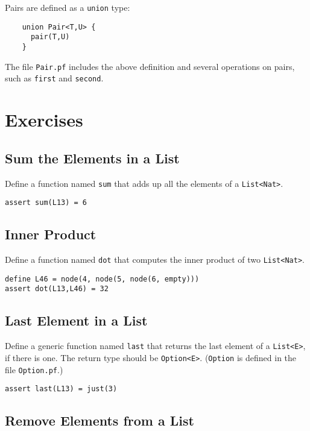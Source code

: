 \documentclass[12pt]{article}
\begin{document}
Pairs are defined as a \texttt{union} type:

\begin{verbatim}
    union Pair<T,U> {
      pair(T,U)
    }
\end{verbatim}

The file \texttt{Pair.pf} includes the above definition and several
operations on pairs, such as \texttt{first} and \texttt{second}.

\section{Exercises}

\subsection{Sum the Elements in a List}

Define a function named \texttt{sum} that adds up all the elements of a \texttt{List<Nat>}.

\begin{verbatim}
assert sum(L13) = 6
\end{verbatim}

\subsection{Inner Product}

Define a function named \texttt{dot} that computes the inner product of two \texttt{List<Nat>}.

\begin{verbatim}
define L46 = node(4, node(5, node(6, empty)))
assert dot(L13,L46) = 32
\end{verbatim}

\subsection{Last Element in a List}

Define a generic function named \texttt{last} that returns the last element
of a \texttt{List<E>}, if there is one. The return type should be \texttt{Option<E>}.
(\texttt{Option} is defined in the file \texttt{Option.pf}.)

\begin{verbatim}
assert last(L13) = just(3)
\end{verbatim}

\subsection{Remove Elements from a List}
\end{document}
